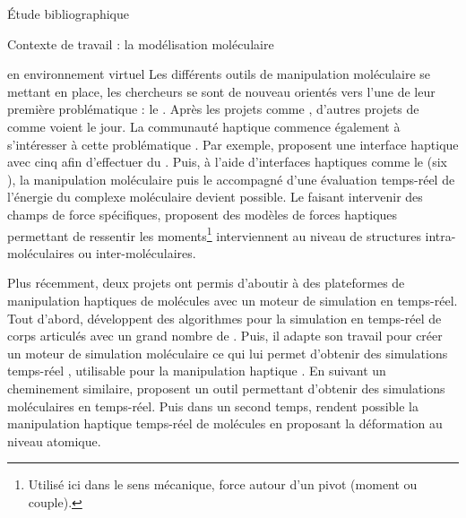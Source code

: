 \documentclass[myfrancais,ngerman,english,french]{mythesis}
\begin{document}
\begin{mychapter}{Étude bibliographique}
\begin{mysection}{Contexte de travail : la modélisation moléculaire}
\begin{mysubsection}{ en environnement virtuel}
				Les différents outils de manipulation moléculaire se mettant en place, les chercheurs se sont de nouveau orientés vers l'une de leur première problématique : le .
				Après les projets comme \myGROPE, d'autres projets de  comme \mySTALK {} voient le jour.
				La communauté haptique commence également à s'intéresser à cette problématique .
				Par exemple,  proposent une interface haptique avec cinq   afin d'effectuer du  .
				Puis, à l'aide d'interfaces haptiques comme le \myVirtuose (six ), la manipulation moléculaire  puis le   accompagné d'une évaluation temps-réel de l'énergie du complexe moléculaire devient possible.
				Le  faisant intervenir des champs de force spécifiques,  proposent des modèles de forces haptiques permettant de ressentir les moments\footnote{Utilisé ici dans le sens mécanique, force autour d'un pivot (moment ou couple).} interviennent au niveau de structures intra-moléculaires ou inter-moléculaires.

				Plus récemment, deux projets ont permis d'aboutir à des plateformes de manipulation haptiques de molécules avec un moteur de simulation en temps-réel.
				Tout d'abord,  développent des algorithmes pour la simulation en temps-réel de corps articulés avec un grand nombre de .
				Puis, il adapte son travail pour créer un moteur de simulation moléculaire ce qui lui permet d'obtenir des simulations temps-réel , utilisable pour la manipulation haptique .
				En suivant un cheminement similaire,  proposent un outil permettant d'obtenir des simulations moléculaires en temps-réel.
				Puis dans un second temps,  rendent possible la manipulation haptique temps-réel de molécules en proposant la déformation au niveau atomique.

				\begin{myfigure}
				\end{myfigure}


\end{mysubsection}
\end{mysection}
\end{mychapter}
\end{document}
